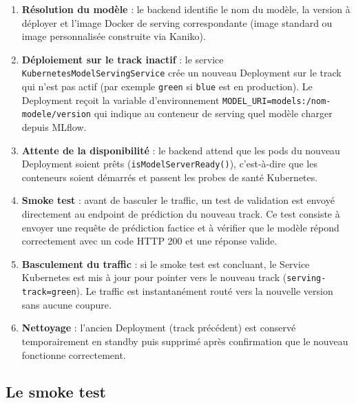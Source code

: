 \begin{enumerate}
    \item \textbf{Résolution du modèle} : le backend identifie le
    nom du modèle, la version à déployer et l'image Docker de
    serving correspondante (image standard ou image personnalisée
    construite via Kaniko).

    \item \textbf{Déploiement sur le track inactif} : le service
    \texttt{KubernetesModelServingService} crée un nouveau
    Deployment sur le track qui n'est pas actif (par exemple
    \texttt{green} si \texttt{blue} est en production). Le
    Deployment reçoit la variable d'environnement
    \texttt{MODEL\_URI=models:/nom-modele/version} qui indique
    au conteneur de serving quel modèle charger depuis MLflow.

    \item \textbf{Attente de la disponibilité} : le backend
    attend que les pods du nouveau Deployment soient prêts
    (\texttt{isModelServerReady()}), c'est-à-dire que les
    conteneurs soient démarrés et passent les probes de
    santé Kubernetes.

    \item \textbf{Smoke test} : avant de basculer le traffic,
    un test de validation est envoyé directement au endpoint
    de prédiction du nouveau track. Ce test consiste à envoyer
    une requête de prédiction factice et à vérifier que le
    modèle répond correctement avec un code HTTP 200 et une
    réponse valide.

    \item \textbf{Basculement du traffic} : si le smoke test
    est concluant, le Service Kubernetes est mis à jour pour
    pointer vers le nouveau track (\texttt{serving-track=green}).
    Le traffic est instantanément routé vers la nouvelle version
    sans aucune coupure.

    \item \textbf{Nettoyage} : l'ancien Deployment (track
    précédent) est conservé temporairement en standby puis
    supprimé après confirmation que le nouveau fonctionne
    correctement.
\end{enumerate}


\subsection{Le smoke test}
\label{subsec:sprint3-smoke-test}

